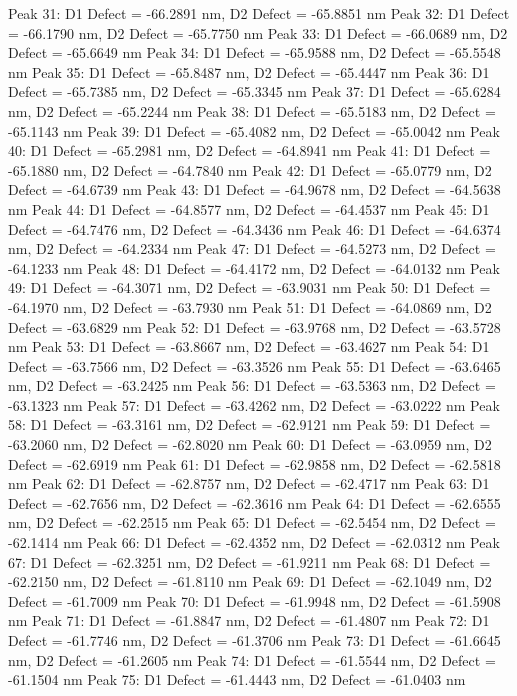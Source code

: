 \documentclass{article}
\begin{document}
Peak 31: D1 Defect = -66.2891 nm, D2 Defect = -65.8851 nm
Peak 32: D1 Defect = -66.1790 nm, D2 Defect = -65.7750 nm
Peak 33: D1 Defect = -66.0689 nm, D2 Defect = -65.6649 nm
Peak 34: D1 Defect = -65.9588 nm, D2 Defect = -65.5548 nm
Peak 35: D1 Defect = -65.8487 nm, D2 Defect = -65.4447 nm
Peak 36: D1 Defect = -65.7385 nm, D2 Defect = -65.3345 nm
Peak 37: D1 Defect = -65.6284 nm, D2 Defect = -65.2244 nm
Peak 38: D1 Defect = -65.5183 nm, D2 Defect = -65.1143 nm
Peak 39: D1 Defect = -65.4082 nm, D2 Defect = -65.0042 nm
Peak 40: D1 Defect = -65.2981 nm, D2 Defect = -64.8941 nm
Peak 41: D1 Defect = -65.1880 nm, D2 Defect = -64.7840 nm
Peak 42: D1 Defect = -65.0779 nm, D2 Defect = -64.6739 nm
Peak 43: D1 Defect = -64.9678 nm, D2 Defect = -64.5638 nm
Peak 44: D1 Defect = -64.8577 nm, D2 Defect = -64.4537 nm
Peak 45: D1 Defect = -64.7476 nm, D2 Defect = -64.3436 nm
Peak 46: D1 Defect = -64.6374 nm, D2 Defect = -64.2334 nm
Peak 47: D1 Defect = -64.5273 nm, D2 Defect = -64.1233 nm
Peak 48: D1 Defect = -64.4172 nm, D2 Defect = -64.0132 nm
Peak 49: D1 Defect = -64.3071 nm, D2 Defect = -63.9031 nm
Peak 50: D1 Defect = -64.1970 nm, D2 Defect = -63.7930 nm
Peak 51: D1 Defect = -64.0869 nm, D2 Defect = -63.6829 nm
Peak 52: D1 Defect = -63.9768 nm, D2 Defect = -63.5728 nm
Peak 53: D1 Defect = -63.8667 nm, D2 Defect = -63.4627 nm
Peak 54: D1 Defect = -63.7566 nm, D2 Defect = -63.3526 nm
Peak 55: D1 Defect = -63.6465 nm, D2 Defect = -63.2425 nm
Peak 56: D1 Defect = -63.5363 nm, D2 Defect = -63.1323 nm
Peak 57: D1 Defect = -63.4262 nm, D2 Defect = -63.0222 nm
Peak 58: D1 Defect = -63.3161 nm, D2 Defect = -62.9121 nm
Peak 59: D1 Defect = -63.2060 nm, D2 Defect = -62.8020 nm
Peak 60: D1 Defect = -63.0959 nm, D2 Defect = -62.6919 nm
Peak 61: D1 Defect = -62.9858 nm, D2 Defect = -62.5818 nm
Peak 62: D1 Defect = -62.8757 nm, D2 Defect = -62.4717 nm
Peak 63: D1 Defect = -62.7656 nm, D2 Defect = -62.3616 nm
Peak 64: D1 Defect = -62.6555 nm, D2 Defect = -62.2515 nm
Peak 65: D1 Defect = -62.5454 nm, D2 Defect = -62.1414 nm
Peak 66: D1 Defect = -62.4352 nm, D2 Defect = -62.0312 nm
Peak 67: D1 Defect = -62.3251 nm, D2 Defect = -61.9211 nm
Peak 68: D1 Defect = -62.2150 nm, D2 Defect = -61.8110 nm
Peak 69: D1 Defect = -62.1049 nm, D2 Defect = -61.7009 nm
Peak 70: D1 Defect = -61.9948 nm, D2 Defect = -61.5908 nm
Peak 71: D1 Defect = -61.8847 nm, D2 Defect = -61.4807 nm
Peak 72: D1 Defect = -61.7746 nm, D2 Defect = -61.3706 nm
Peak 73: D1 Defect = -61.6645 nm, D2 Defect = -61.2605 nm
Peak 74: D1 Defect = -61.5544 nm, D2 Defect = -61.1504 nm
Peak 75: D1 Defect = -61.4443 nm, D2 Defect = -61.0403 nm
\end{document}
